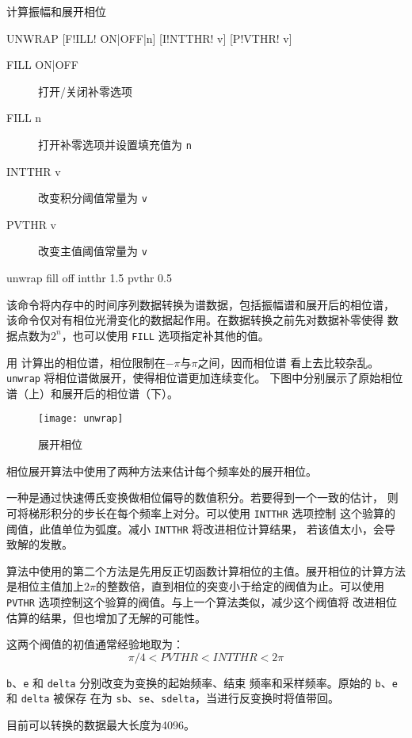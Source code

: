 \label{cmd:unwrap}

计算振幅和展开相位

\begin{SACSTX}
UNWRAP [F!ILL! ON|OFF|n] [I!NTTHR! v] [P!VTHR! v]
\end{SACSTX}

\begin{description}
\item [FILL ON|OFF] 打开/关闭补零选项
\item [FILL n] 打开补零选项并设置填充值为 \texttt{n}
\item [INTTHR v] 改变积分阈值常量为 \texttt{v}
\item [PVTHR v] 改变主值阈值常量为 \texttt{v}
\end{description}

\begin{SACDFT}
unwrap fill off intthr 1.5 pvthr 0.5
\end{SACDFT}

该命令将内存中的时间序列数据转换为谱数据，包括振幅谱和展开后的相位谱，
该命令仅对有相位光滑变化的数据起作用。在数据转换之前先对数据补零使得
数据点数为$2^n$，也可以使用 \texttt{FILL} 选项指定补其他的值。

用  计算出的相位谱，相位限制在$-\pi$与$\pi$之间，因而相位谱
看上去比较杂乱。\texttt{unwrap} 将相位谱做展开，使得相位谱更加连续变化。
下图中分别展示了原始相位谱（上）和展开后的相位谱（下）。

\begin{figure}[H]
\centering
\texttt{[image: unwrap]}
\caption{展开相位}
\end{figure}

相位展开算法中使用了两种方法来估计每个频率处的展开相位。

一种是通过快速傅氏变换做相位偏导的数值积分。若要得到一个一致的估计，
则可将梯形积分的步长在每个频率上对分。可以使用 \texttt{INTTHR} 选项控制
这个验算的阈值，此值单位为弧度。减小 \texttt{INTTHR} 将改进相位计算结果，
若该值太小，会导致解的发散。

算法中使用的第二个方法是先用反正切函数计算相位的主值。展开相位的计算方法
是相位主值加上$2\pi$的整数倍，直到相位的突变小于给定的阀值为止。可以使用
\texttt{PVTHR} 选项控制这个验算的阀值。与上一个算法类似，减少这个阀值将
改进相位估算的结果，但也增加了无解的可能性。

这两个阀值的初值通常经验地取为：
\[ \pi/4 < PVTHR < INTTHR < 2\pi \]

\texttt{b}、\texttt{e} 和 \texttt{delta} 分别改变为变换的起始频率、结束
频率和采样频率。原始的 \texttt{b}、\texttt{e} 和 \texttt{delta} 被保存
在为 \texttt{sb}、\texttt{se}、\texttt{sdelta}，当进行反变换时将值带回。

目前可以转换的数据最大长度为4096。
